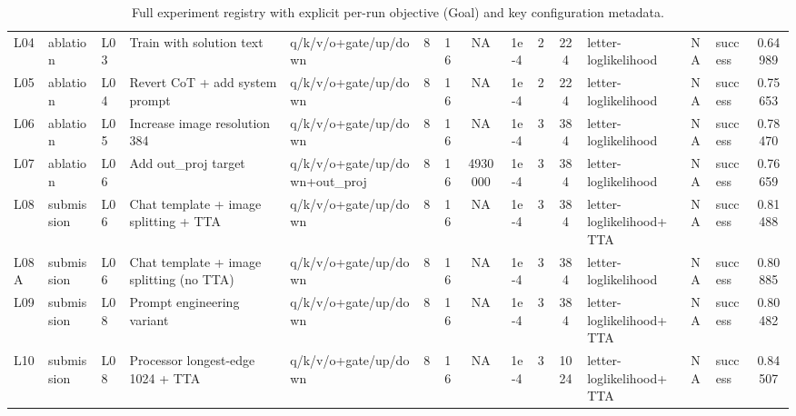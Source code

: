 \begin{table}[p]
\begin{tabular}{l l l p{2.8cm} p{2.5cm} c c c c c c p{1.8cm} c l c}
L04 & ablation & L03 & Train with solution text & q/k/v/o+gate/up/down & 8 & 16 & NA & 1e-4 & 2 & 224 & letter-loglikelihood & NA & success & 0.64989 \\
L05 & ablation & L04 & Revert CoT + add system prompt & q/k/v/o+gate/up/down & 8 & 16 & NA & 1e-4 & 2 & 224 & letter-loglikelihood & NA & success & 0.75653 \\
L06 & ablation & L05 & Increase image resolution 384 & q/k/v/o+gate/up/down & 8 & 16 & NA & 1e-4 & 3 & 384 & letter-loglikelihood & NA & success & 0.78470 \\
L07 & ablation & L06 & Add out\_proj target & q/k/v/o+gate/up/down+out\_proj & 8 & 16 & 4930000 & 1e-4 & 3 & 384 & letter-loglikelihood & NA & success & 0.76659 \\
L08 & submission & L06 & Chat template + image splitting + TTA & q/k/v/o+gate/up/down & 8 & 16 & NA & 1e-4 & 3 & 384 & letter-loglikelihood+TTA & NA & success & 0.81488 \\
L08A & submission & L06 & Chat template + image splitting (no TTA) & q/k/v/o+gate/up/down & 8 & 16 & NA & 1e-4 & 3 & 384 & letter-loglikelihood & NA & success & 0.80885 \\
L09 & submission & L08 & Prompt engineering variant & q/k/v/o+gate/up/down & 8 & 16 & NA & 1e-4 & 3 & 384 & letter-loglikelihood+TTA & NA & success & 0.80482 \\
L10 & submission & L08 & Processor longest-edge 1024 + TTA & q/k/v/o+gate/up/down & 8 & 16 & NA & 1e-4 & 3 & 1024 & letter-loglikelihood+TTA & NA & success & 0.84507 \\
\hline
\end{tabular}
\caption{Full experiment registry with explicit per-run objective (Goal) and key configuration metadata.}
\label{tab:full-registry}
\end{table}
